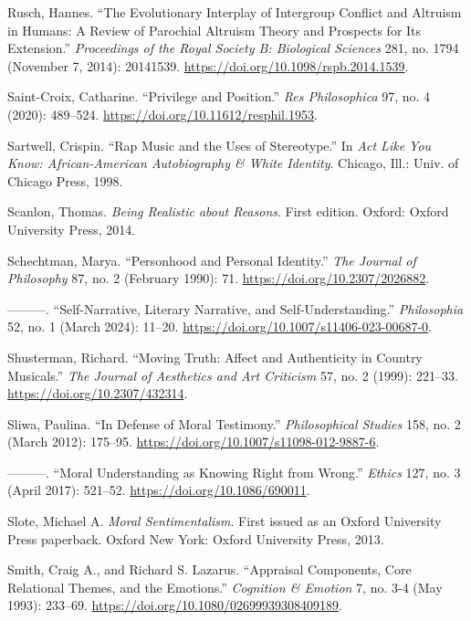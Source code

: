 \documentclass[phdthesis,12pt,final]{wuthesis}
\newlength{\cslhangindent}
\newenvironment{CSLReferences}[2] %
{\begin{list}{}{%
	\setlength{\itemindent}{0pt}
	\setlength{\leftmargin}{0pt}
	\setlength{\parsep}{0pt}
	\ifodd #1
	\setlength{\leftmargin}{\cslhangindent}
	\setlength{\itemindent}{-1\cslhangindent}
	\fi
	\setlength{\itemsep}{#2\baselineskip}}}
{\end{list}}
\theoremstyle{definition}
\theoremstyle{definition}
\theoremstyle{definition}
\theoremstyle{definition}
\theoremstyle{remark}
\begin{document}
\begin{CSLReferences}{1}{0}
Rusch, Hannes. {``The Evolutionary Interplay of Intergroup Conflict and Altruism in Humans: A Review of Parochial Altruism Theory and Prospects for Its Extension.''} \emph{Proceedings of the Royal Society B: Biological Sciences} 281, no. 1794 (November 7, 2014): 20141539. \url{https://doi.org/10.1098/rspb.2014.1539}.

Saint-Croix, Catharine. {``Privilege and {Position}.''} \emph{Res Philosophica} 97, no. 4 (2020): 489--524. \url{https://doi.org/10.11612/resphil.1953}.

Sartwell, Crispin. {``Rap {Music} and the {Uses} of {Stereotype}.''} In \emph{Act Like You Know: {African-American} Autobiography \& White Identity}. Chicago, Ill.: Univ. of Chicago Press, 1998.

Scanlon, Thomas. \emph{Being Realistic about Reasons}. First edition. Oxford: Oxford University Press, 2014.

Schechtman, Marya. {``Personhood and {Personal Identity}.''} \emph{The Journal of Philosophy} 87, no. 2 (February 1990): 71. \url{https://doi.org/10.2307/2026882}.

---------. {``Self-{Narrative}, {Literary Narrative}, and {Self-Understanding}.''} \emph{Philosophia} 52, no. 1 (March 2024): 11--20. \url{https://doi.org/10.1007/s11406-023-00687-0}.

Shusterman, Richard. {``Moving {Truth}: {Affect} and {Authenticity} in {Country Musicals}.''} \emph{The Journal of Aesthetics and Art Criticism} 57, no. 2 (1999): 221--33. \url{https://doi.org/10.2307/432314}.

Sliwa, Paulina. {``In Defense of Moral Testimony.''} \emph{Philosophical Studies} 158, no. 2 (March 2012): 175--95. \url{https://doi.org/10.1007/s11098-012-9887-6}.

---------. {``Moral {Understanding} as {Knowing Right} from {Wrong}.''} \emph{Ethics} 127, no. 3 (April 2017): 521--52. \url{https://doi.org/10.1086/690011}.

Slote, Michael A. \emph{Moral {Sentimentalism}}. First issued as an Oxford University Press paperback. Oxford New York: Oxford University Press, 2013.

Smith, Craig A., and Richard S. Lazarus. {``Appraisal {Components}, {Core Relational Themes}, and the {Emotions}.''} \emph{Cognition \& Emotion} 7, no. 3-4 (May 1993): 233--69. \url{https://doi.org/10.1080/02699939308409189}.


\end{CSLReferences}
\end{document}
